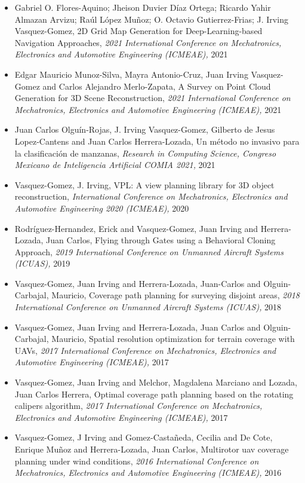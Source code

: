 \begin{itemize} 
\item Gabriel O. Flores-Aquino; Jheison Duvier Díaz Ortega; Ricardo Yahir Almazan Arvizu; Raúl López Muñoz; O. Octavio Gutierrez-Frias; J. Irving Vasquez-Gomez, 2D Grid Map Generation for Deep-Learning-based Navigation Approaches, \textit{ 2021 International Conference on Mechatronics, Electronics and Automotive Engineering (ICMEAE),} 2021 
\item Edgar Mauricio Munoz-Silva, Mayra Antonio-Cruz, Juan Irving Vasquez-Gomez and Carlos Alejandro Merlo-Zapata, A Survey on Point Cloud Generation for 3D Scene Reconstruction, \textit{ 2021 International Conference on Mechatronics, Electronics and Automotive Engineering (ICMEAE),} 2021 
\item Juan Carlos Olguín-Rojas, J. Irving Vasquez-Gomez, Gilberto de Jesus Lopez-Cantens and Juan Carlos Herrera-Lozada, Un método no invasivo para la clasificación de manzanas, \textit{ Research in Computing Science, Congreso Mexicano de Inteligencia Artificial COMIA 2021,} 2021 
\item Vasquez-Gomez, J. Irving, VPL: A view planning library for 3D object reconstruction, \textit{ International Conference on Mechatronics, Electronics and Automotive Engineering 2020 (ICMEAE),} 2020 
\item Rodríguez-Hernandez, Erick and Vasquez-Gomez, Juan Irving and Herrera-Lozada, Juan Carlos, Flying through Gates using a Behavioral Cloning Approach, \textit{ 2019 International Conference on Unmanned Aircraft Systems (ICUAS),} 2019 
\item Vasquez-Gomez, Juan Irving and Herrera-Lozada, Juan-Carlos and Olguin-Carbajal, Mauricio, Coverage path planning for surveying disjoint areas, \textit{ 2018 International Conference on Unmanned Aircraft Systems (ICUAS),} 2018 
\item Vasquez-Gomez, Juan Irving and Herrera-Lozada, Juan Carlos and Olguin-Carbajal, Mauricio, Spatial resolution optimization for terrain coverage with UAVs, \textit{ 2017 International Conference on Mechatronics, Electronics and Automotive Engineering (ICMEAE),} 2017 
\item Vasquez-Gomez, Juan Irving and Melchor, Magdalena Marciano and Lozada, Juan Carlos Herrera, Optimal coverage path planning based on the rotating calipers algorithm, \textit{ 2017 International Conference on Mechatronics, Electronics and Automotive Engineering (ICMEAE),} 2017 
\item Vasquez-Gomez, J Irving and Gomez-Casta{\~n}eda, Cecilia and De Cote, Enrique Mu{\~n}oz and Herrera-Lozada, Juan Carlos, Multirotor uav coverage planning under wind conditions, \textit{ 2016 International Conference on Mechatronics, Electronics and Automotive Engineering (ICMEAE),} 2016 

\end{itemize}
